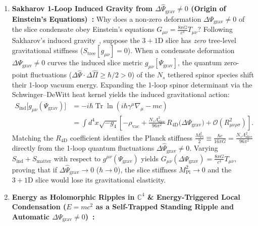 \documentclass[11pt,a4paper]{article}
\begin{document}
\begin{enumerate}
    \begin{equation}
    v_{\text{EW}} = M_{\text{Pl}}\, \exp\!\left(-\frac{8\pi^2}{N_c y_t^2}\right) \ll M_{\text{Pl}}.
    \end{equation}
    \item \textbf{Sakharov 1-Loop Induced Gravity from $\Delta \hat{\Psi}_{\text{grav}} \neq 0$ (Origin of Einstein's Equations)~\cite{Sakharov1967}:}
    Why does a non-zero deformation $\Delta \Psi_{\text{grav}} \neq 0$ of the slice condensate obey Einstein's equations $G_{\mu\nu} = \frac{8\pi G}{c^4}T_{\mu\nu}$? Following Sakharov's induced gravity~\cite{Sakharov1967}, suppose the $3+1\text{D}$ slice has \emph{zero} tree-level gravitational stiffness ($S_{\text{tree}}[g_{\mu\nu}] = 0$). When a condensate deformation $\Delta\Psi_{\text{grav}} \neq 0$ curves the induced slice metric $g_{\mu\nu}[\Psi_{\text{grav}}]$, the quantum zero-point fluctuations ($\Delta\hat{\Psi} \cdot \Delta\hat{\Pi} \ge \hbar/2 > 0$) of the $N_s$ tethered spinor species shift their 1-loop vacuum energy. Expanding the 1-loop spinor determinant via the Schwinger--DeWitt heat kernel yields the induced gravitational action:
    \begin{equation}
    \begin{aligned}
    S_{\text{ind}}\big[g_{\mu\nu}(\Psi_{\text{grav}})\big] &= -i\hbar \operatorname{Tr}\ln\!\left(i\hbar\gamma^\mu\nabla_\mu - mc\right) \\
    &= \int d^4x \sqrt{-g_4}\left[ -\rho_{\text{vac}} + \frac{N_s \Lambda_{\text{slice}}^2}{96\pi^2}\, R_{4\text{D}}\big(\Delta\Psi_{\text{grav}}\big) + \mathcal{O}\!\left(R_{\mu\nu\rho\sigma}^2\right) \right].
    \end{aligned}
    \end{equation}
    Matching the $R_{4\text{D}}$ coefficient identifies the Planck stiffness $\frac{M_{\text{Pl}}^2}{2} \equiv \frac{\hbar c}{16\pi G} = \frac{N_s \Lambda_{\text{slice}}^2}{96\pi^2}$ directly from the 1-loop quantum fluctuations $\Delta\hat{\Psi}_{\text{grav}} \neq 0$. Varying $S_{\text{ind}} + S_{\text{matter}}$ with respect to $g^{\mu\nu}(\Psi_{\text{grav}})$ yields $G_{\mu\nu}(\Delta\Psi_{\text{grav}}) = \frac{8\pi G}{c^4} T_{\mu\nu}$, proving that if $\Delta\hat{\Psi}_{\text{grav}} \to 0$ ($\hbar \to 0$), the slice stiffness $M_{\text{Pl}}^2 \to 0$ and the $3+1\text{D}$ slice would lose its gravitational elasticity.
    \item \textbf{Energy as Holomorphic Ripples in $\mathbb{C}^4$ \& Energy-Triggered Local Condensation ($E = mc^2$ as a Self-Trapped Standing Ripple and Automatic $\Delta\Psi_{\text{grav}} \neq 0$)~\cite{Dirac1928,Wheeler1955}:}

\end{enumerate}
\end{document}
